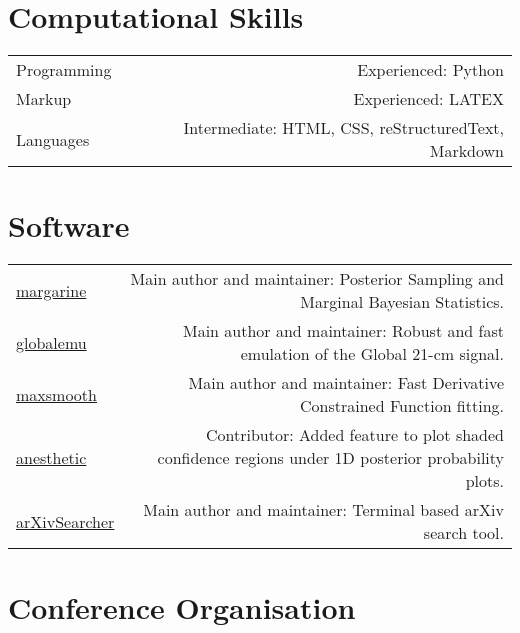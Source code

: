 \documentclass{article}
\begin{document}
\section*{Computational Skills}

\begin{tabular}{L!{\vrule}R}
	Programming & Experienced: Python \\
	Markup & Experienced: LATEX \\
	Languages & Intermediate: HTML, CSS, reStructuredText, Markdown
\end{tabular}

\section*{Software}

\begin{tabular}{L!{\vrule}R}
	\href{https://github.com/htjb/margarine}{margarine} & Main author and maintainer: Posterior Sampling and Marginal Bayesian Statistics. \\
	\href{https://github.com/htjb/globalemu}{globalemu} & Main author and maintainer: Robust and fast emulation of the Global 21-cm signal.\\
	\href{https://github.com/htjb/maxsmooth}{maxsmooth} & Main author and maintainer: Fast Derivative Constrained Function fitting.\\
	\href{https://github.com/williamjameshandley/anesthetic}{anesthetic} & Contributor: Added feature to plot shaded confidence regions under 1D posterior probability plots.\\
	\href{https://github.com/htjb/arXivSearcher}{arXivSearcher} & Main author and maintainer: Terminal based arXiv search tool.
\end{tabular}

\section*{Conference Organisation}
\end{document}
